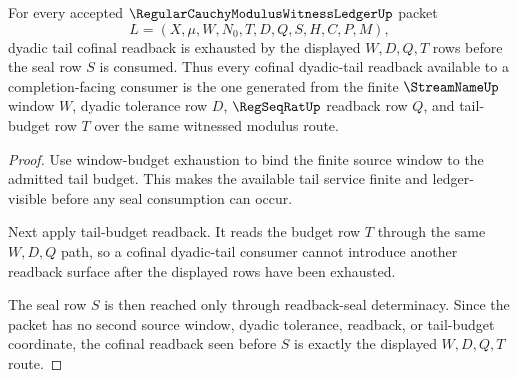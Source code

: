 \begin{theorem}
\label{thm:regular-cauchy-modulus-witness-ledger-dyadic-tail-cofinal-readback}
For every accepted $\RegularCauchyModulusWitnessLedgerUp$ packet
$$
L=(X,\mu,W,N_0,T,D,Q,S,H,C,P,M),
$$
dyadic tail cofinal readback is exhausted by the displayed $W,D,Q,T$ rows before the seal row $S$ is consumed. Thus every cofinal dyadic-tail readback available to a completion-facing consumer is the one generated from the finite $\StreamNameUp$ window $W$, dyadic tolerance row $D$, $\RegSeqRatUp$ readback row $Q$, and tail-budget row $T$ over the same witnessed modulus route.
\end{theorem}
\begin{proof}
Use window-budget exhaustion to bind the finite source window to the admitted tail budget. This makes the available tail service finite and ledger-visible before any seal consumption can occur.

Next apply tail-budget readback. It reads the budget row $T$ through the same $W,D,Q$ path, so a cofinal dyadic-tail consumer cannot introduce another readback surface after the displayed rows have been exhausted.

The seal row $S$ is then reached only through readback-seal determinacy. Since the packet has no second source window, dyadic tolerance, readback, or tail-budget coordinate, the cofinal readback seen before $S$ is exactly the displayed $W,D,Q,T$ route.
\end{proof}


